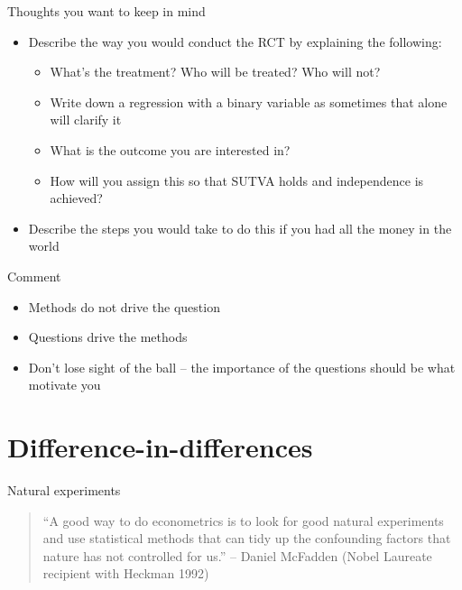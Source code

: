 \documentclass{beamer}
\begin{document}
\begin{frame}{Thoughts you want to keep in mind}

  \begin{itemize}
    \item Describe the way you would conduct the RCT by explaining the following:
          \begin{itemize}
            \item What's the treatment?  Who will be treated? Who will not?
            \item Write down a regression with a binary variable as sometimes that alone will clarify it
            \item What is the outcome you are interested in?
            \item How will you assign this so that SUTVA holds and independence is achieved?
          \end{itemize}
    \item Describe the steps you would take to do this if you had all the money in the world
  \end{itemize}

\end{frame}

\begin{frame}{Comment}

\begin{itemize}

\item Methods do not drive the question
\item Questions drive the methods
\item Don't lose sight of the ball -- the importance of the questions should be what motivate you

\end{itemize}

\end{frame}


\section{Difference-in-differences}

\begin{frame}{Natural experiments}

\begin{quote}
``A good way to do econometrics is to look for good natural experiments and use statistical methods that can tidy up the confounding factors that nature has not controlled for us.'' -- Daniel McFadden (Nobel Laureate recipient with Heckman 1992)
\end{quote}

\end{frame}
\end{document}

